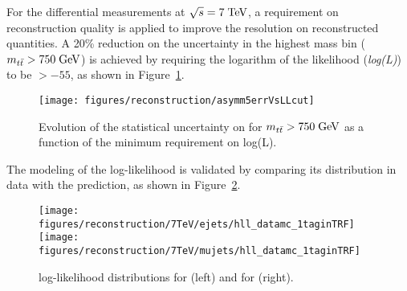 For the differential measurements at $\sqrt{s} = 7 \; \mathrm{TeV}{}$, a
requirement on reconstruction quality is applied to improve the
resolution on reconstructed quantities.
A 20\% reduction on the \ac{} uncertainty in the highest mass bin
($m_{t\bar{t}}{}>750\; \mathrm{GeV}{}$) is achieved by requiring the logarithm of the
likelihood ({\it log(L)}) to be $>-55$, as shown in Figure~\ref{fig:errvsllcut}.
\begin{figure}[!htb]\centering
  \texttt{[image: figures/reconstruction/asymm5errVsLLcut]}
  \caption{
    \label{fig:errvsllcut}
    Evolution of the statistical uncertainty on \ac{} for
    $m_{t\bar{t}}{}>750\; \mathrm{GeV}{}$ as a function of the minimum requirement on
    log(L).
  }
\end{figure}
The modeling of the log-likelihood is validated by comparing its
distribution in data with the prediction, as shown in Figure~\ref{fig:logl}.

\begin{figure}[!htb]\centering
  \texttt{[image: figures/reconstruction/7TeV/ejets/hll\_datamc\_1taginTRF]}
  \texttt{[image: figures/reconstruction/7TeV/mujets/hll\_datamc\_1taginTRF]}                                                                            
  \caption{
    \label{fig:logl}
    log-likelihood distributions for \ejets{} (left) and
    for \mujets{} (right).
    }
\end{figure}

